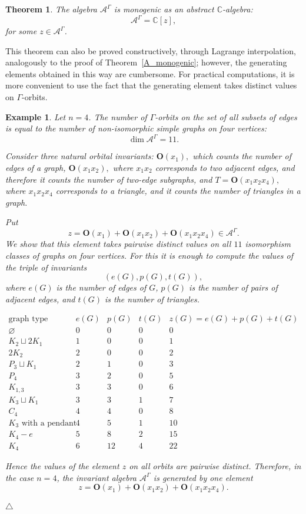 \documentclass[12pt,reqno]{amsart}
\newtheorem{theorem}{Theorem}[section]
\newtheorem{example}{Example}[section]
\begin{document}
\begin{theorem}
The algebra $\mathcal A^\Gamma$ is monogenic as an abstract
$\mathbb C$-algebra:
$$
\mathcal A^\Gamma=\mathbb C[z],
$$
for some $z\in\mathcal A^\Gamma$.
\end{theorem}

This theorem can also be proved constructively, through Lagrange
interpolation, analogously to the proof of Theorem~\ref{A_monogenic};
however, the generating elements obtained in this way are cumbersome. For
practical computations, it is more convenient to use the fact that the
generating element takes distinct values on $\Gamma$-orbits.

\begin{example}{\rm
Let $n=4$. The number of $\Gamma$-orbits on the set of all subsets of edges
is equal to the number of non-isomorphic simple graphs on four vertices:
$$
\dim \mathcal A^\Gamma=11.
$$

Consider three natural orbital invariants:
$
\mathbf O({x}_1),
$
which counts the number of edges of a graph,
$
\mathbf O({x}_1{x}_2),
$
where ${x}_1{x}_2$ corresponds to two adjacent edges, and therefore it counts
the number of two-edge subgraphs, and
$
T=\mathbf O({x}_1{x}_2{x}_4),
$
where ${x}_1{x}_2{x}_4$ corresponds to a triangle, and it counts the number
of triangles in a graph.

Put
$$
z=\mathbf O({x}_1)
+
\mathbf O({x}_1{x}_2)
+
\mathbf O({x}_1{x}_2{x}_4)\in\mathcal A^\Gamma.
$$
We show that this element takes pairwise distinct values on all $11$
isomorphism classes of graphs on four vertices. For this it is enough to
compute the values of the triple of invariants
$$
(e(G),p(G),t(G)),
$$
where $e(G)$ is the number of edges of $G$, $p(G)$ is the number of pairs of
adjacent edges, and $t(G)$ is the number of triangles.

$$
\begin{array}{c|c|c|c|c}
\text{graph type} & e(G) & p(G) & t(G) & z(G)=e(G)+p(G)+t(G)\\
\hline
\varnothing & 0 & 0 & 0 & 0\\
K_2\sqcup 2K_1 & 1 & 0 & 0 & 1\\
2K_2 & 2 & 0 & 0 & 2\\
P_3\sqcup K_1 & 2 & 1 & 0 & 3\\
P_4 & 3 & 2 & 0 & 5\\
K_{1,3} & 3 & 3 & 0 & 6\\
K_3\sqcup K_1 & 3 & 3 & 1 & 7\\
C_4 & 4 & 4 & 0 & 8\\
K_3\text{ with a pendant edge} & 4 & 5 & 1 & 10\\
K_4-e & 5 & 8 & 2 & 15\\
K_4 & 6 & 12 & 4 & 22
\end{array}
$$

Hence the values of the element $z$ on all orbits are pairwise distinct.
Therefore, in the case $n=4$, the invariant algebra $\mathcal A^\Gamma$ is
generated by one element
$$
z=
\mathbf O({x}_1)
+
\mathbf O({x}_1{x}_2)
+
\mathbf O({x}_1{x}_2{x}_4).
$$
}
$\triangle$ \end{example}
\end{document}
